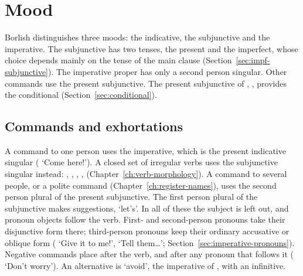 \section{Mood}\label{sec:mood}
Borlish distinguishes three moods: the indicative, the subjunctive and the imperative. The subjunctive has two tenses, the present and the imperfect, whose choice depends mainly on the tense of the main clause (Section~\ref{sec:impf-subjunctive}). The imperative proper has only a second person singular. Other commands use the present subjunctive. The present subjunctive of , , provides the conditional (Section~\ref{sec:conditional}).

\subsection{Commands and exhortations}\label{sec:commands}
A command to one person uses the imperative, which is the present indicative singular ( `Come here!'). A closed set of irregular verbs uses the subjunctive singular instead: , , , ,  (Chapter~\ref{ch:verb-morphology}). A command to several people, or a polite command (Chapter~\ref{ch:register-names}), uses the second person plural of the present subjunctive. The first person plural of the subjunctive makes suggestions, `let's'. In all of these the subject is left out, and pronoun objects follow the verb. First- and second-person pronouns take their disjunctive form there; third-person pronouns keep their ordinary accusative or oblique form ( `Give it to me!',  `Tell them…'; Section~\ref{sec:imperative-pronouns}).
Negative commands place  after the verb, and after any pronoun that follows it ( `Don't worry'). An alternative is  `avoid', the imperative of , with an infinitive.

